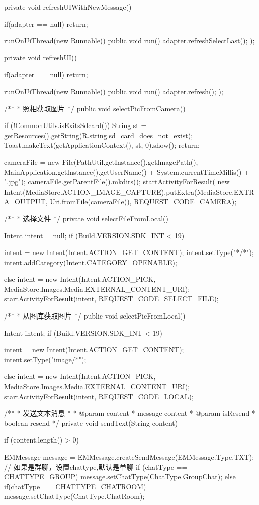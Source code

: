 {{    }
	
	
	private void refreshUIWithNewMessage(){
	    if(adapter == null){
	        return;
	    }
	    
	    runOnUiThread(new Runnable() {
            public void run() {
                adapter.refreshSelectLast();
            }
        });
	}

	private void refreshUI() {
	    if(adapter == null){
            return;
        }
	    
		runOnUiThread(new Runnable() {
			public void run() {
				adapter.refresh();
			}
		});
	}

	/**
	 * 照相获取图片
	 */
	public void selectPicFromCamera() {
		if (!CommonUtils.isExitsSdcard()) {
			String st = getResources().getString(R.string.sd_card_does_not_exist);
			Toast.makeText(getApplicationContext(), st, 0).show();
			return;
		}

		cameraFile = new File(PathUtil.getInstance().getImagePath(), MainApplication.getInstance().getUserName()
				+ System.currentTimeMillis() + ".jpg");
		cameraFile.getParentFile().mkdirs();
		startActivityForResult(
				new Intent(MediaStore.ACTION_IMAGE_CAPTURE).putExtra(MediaStore.EXTRA_OUTPUT, Uri.fromFile(cameraFile)),
				REQUEST_CODE_CAMERA);
	}

	/**
	 * 选择文件
	 */
	private void selectFileFromLocal() {
		Intent intent = null;
		if (Build.VERSION.SDK_INT < 19) {
			intent = new Intent(Intent.ACTION_GET_CONTENT);
			intent.setType("*/*");
			intent.addCategory(Intent.CATEGORY_OPENABLE);

		} else {
			intent = new Intent(Intent.ACTION_PICK, MediaStore.Images.Media.EXTERNAL_CONTENT_URI);
		}
		startActivityForResult(intent, REQUEST_CODE_SELECT_FILE);
	}

	/**
	 * 从图库获取图片
	 */
	public void selectPicFromLocal() {
		Intent intent;
		if (Build.VERSION.SDK_INT < 19) {
			intent = new Intent(Intent.ACTION_GET_CONTENT);
			intent.setType("image/*");

		} else {
			intent = new Intent(Intent.ACTION_PICK, MediaStore.Images.Media.EXTERNAL_CONTENT_URI);
		}
		startActivityForResult(intent, REQUEST_CODE_LOCAL);
	}

	/**
	 * 发送文本消息
	 * 
	 * @param content
	 *            message content
	 * @param isResend
	 *            boolean resend
	 */
	private void sendText(String content) {

		if (content.length() > 0) {
			EMMessage message = EMMessage.createSendMessage(EMMessage.Type.TXT);
			// 如果是群聊，设置chattype,默认是单聊
			if (chatType == CHATTYPE_GROUP){
			    message.setChatType(ChatType.GroupChat);
			}else if(chatType == CHATTYPE_CHATROOM){
			    message.setChatType(ChatType.ChatRoom);
			}
			
}}}
